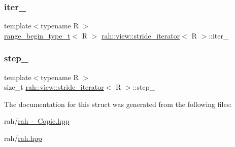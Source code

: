 \subsubsection{\texorpdfstring{iter\_}{iter\_}}
{\footnotesize\ttfamily template$<$typename R $>$ \\
\mbox{\hyperlink{namespacerah_a28aff4eeddcece6be65ff0b956d32d4a}{range\+\_\+begin\+\_\+type\+\_\+t}}$<$ R $>$ \mbox{\hyperlink{structrah_1_1view_1_1stride__iterator}{rah\+::view\+::stride\+\_\+iterator}}$<$ R $>$\+::iter\+\_\+}

\mbox{\label{structrah_1_1view_1_1stride__iterator_a1b2e6cfb0631cde24284f56b17a4452c}} 
\subsubsection{\texorpdfstring{step\_}{step\_}}
{\footnotesize\ttfamily template$<$typename R $>$ \\
size\+\_\+t \mbox{\hyperlink{structrah_1_1view_1_1stride__iterator}{rah\+::view\+::stride\+\_\+iterator}}$<$ R $>$\+::step\+\_\+}



The documentation for this struct was generated from the following files\+:\begin{DoxyCompactItemize}
\item 
rah/\mbox{\hyperlink{rah_01-_01_copie_8hpp}{rah -\/ Copie.\+hpp}}\item 
rah/\mbox{\hyperlink{rah_8hpp}{rah.\+hpp}}\end{DoxyCompactItemize}
